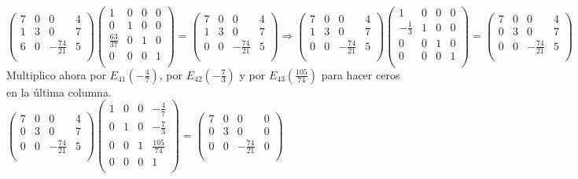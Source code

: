 \documentclass[11pt, a4paper]{article}
\newif\IfInSansMode
\theoremstyle{theorem-style}
\theoremstyle{definition-style}
\theoremstyle{remark-style}
\theoremstyle{example-style}
\begin{document}
$\begin{pmatrix}
7 & 0 & 0 & 4 \\
1 & 3 & 0 & 7 \\
6 & 0 & -\frac{74}{21} & 5 \\
\end{pmatrix}
\begin{pmatrix}
1 & 0 & 0 & 0 \\
0 & 1 & 0 & 0 \\
\frac{63}{37} & 0 & 1 & 0 \\
0 & 0 & 0 & 1 \\
\end{pmatrix}  
 = 
\begin{pmatrix}
7 & 0 & 0 & 4 \\
1 & 3 & 0 & 7 \\
0 & 0 & -\frac{74}{21} & 5 \\
\end{pmatrix} \Longrightarrow
\begin{pmatrix}
7 & 0 & 0 & 4 \\
1 & 3 & 0 & 7 \\
0 & 0 & -\frac{74}{21} & 5 \\
\end{pmatrix}
\begin{pmatrix}
1 & 0 & 0 & 0 \\
-\frac{1}{3} & 1 & 0 & 0 \\
0 & 0 & 1 & 0 \\
0 & 0 & 0 & 1 \\
\end{pmatrix}   
 = 
\begin{pmatrix}
7 & 0 & 0 & 4 \\
0 & 3 & 0 & 7 \\
0 & 0 & -\frac{74}{21} & 5 \\
\end{pmatrix}$ \\

Multiplico ahora por $E_{41}(-\frac{4}{7})$, por $E_{42}(-\frac{7}{3})$ y por $E_{43}(\frac{105}{74})$ para hacer ceros en la última columna. \\

$\begin{pmatrix}
7 & 0 & 0 & 4 \\
0 & 3 & 0 & 7 \\
0 & 0 & -\frac{74}{21} & 5 \\
\end{pmatrix}
\begin{pmatrix}
1 & 0 & 0 & -\frac{4}{7} \\
0 & 1 & 0 & -\frac{7}{3} \\
0 & 0 & 1 & \frac{105}{74} \\
0 & 0 & 0 & 1 \\
\end{pmatrix}   
 = 
\begin{pmatrix}
7 & 0 & 0 & 0 \\
0 & 3 & 0 & 0 \\
0 & 0 & -\frac{74}{21} & 0 \\
\end{pmatrix}$ \\
\end{document}

